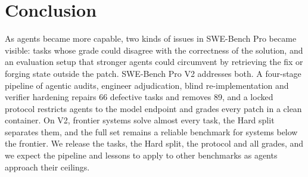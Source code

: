 \section{Conclusion}
As agents became more capable, two kinds of issues in SWE-Bench Pro became visible: tasks whose grade could disagree with the correctness of the solution, and an evaluation setup that stronger agents could circumvent by retrieving the fix or forging state outside the patch. SWE-Bench Pro V2 addresses both. A four-stage pipeline of agentic audits, engineer adjudication, blind re-implementation and verifier hardening repairs 66 defective tasks and removes 89, and a locked protocol restricts agents to the model endpoint and grades every patch in a clean container. On V2, frontier systems solve almost every task, the Hard split separates them, and the full set remains a reliable benchmark for systems below the frontier. We release the tasks, the Hard split, the protocol and all grades, and we expect the pipeline and lessons to apply to other benchmarks as agents approach their ceilings.
